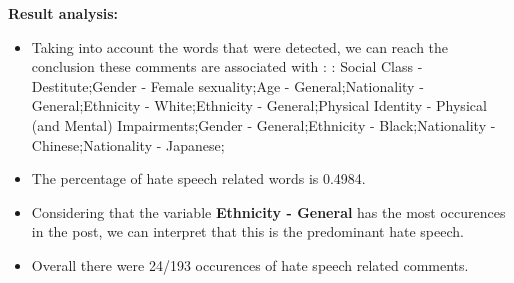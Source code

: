 \documentclass[11pt]{article}
\begin{document}
\textbf{\Large Result analysis:}

\begin{itemize}\item Taking into account the words that were detected, we can reach the conclusion these comments are associated with : : Social Class - Destitute;Gender - Female sexuality;Age - General;Nationality - General;Ethnicity - White;Ethnicity - General;Physical Identity - Physical (and Mental) Impairments;Gender - General;Ethnicity - Black;Nationality - Chinese;Nationality - Japanese;%

\item The percentage of hate speech related words is 0.4984.

\item Considering that the variable \textbf{Ethnicity - General} has the most occurences in the post, we can interpret that this is the predominant hate speech.

\item Overall there were 24/193 occurences of hate speech related comments.\end{itemize}
\end{document}
